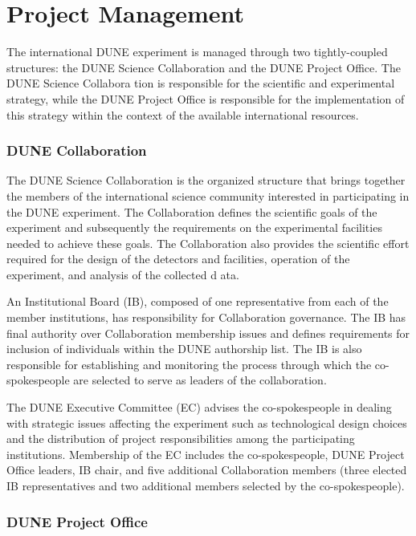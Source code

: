 \chapter{Project Management}
\label{ch:detectors-pm}

The international DUNE experiment is managed through two
tightly-coupled structures: the DUNE Science Collaboration and the
DUNE Project Office.  The DUNE Science Collabora tion is responsible
for the scientific and experimental strategy, while the DUNE Project
Office is responsible for the implementation of this strategy within
the context of the available international resources.

\subsection{DUNE Collaboration}

The DUNE Science Collaboration is the organized structure that brings
together the members of the international science community interested
in participating in the DUNE experiment.  The Collaboration defines
the scientific goals of the experiment and subsequently the
requirements on the experimental facilities needed to achieve these
goals.  The Collaboration also provides the scientific effort required
for the design of the detectors and facilities, operation of the
experiment, and analysis of the collected d ata.

An Institutional Board (IB), composed of one representative from each
of the member institutions, has responsibility for Collaboration
governance.  The IB has final authority over Collaboration membership
issues and defines requirements for inclusion of individuals within
the DUNE authorship list. The IB is also responsible for establishing
and monitoring the process through which the co-spokespeople are
selected to serve as leaders of the collaboration.

The DUNE Executive Committee (EC) advises the co-spokespeople in
dealing with strategic issues affecting the experiment such as
technological design choices and the distribution of project
responsibilities among the participating institutions.  Membership of
the EC includes the co-spokespeople, DUNE Project Office leaders, IB
chair, and five additional Collaboration members (three elected IB
representatives and two additional members selected by the
co-spokespeople).

\subsection{DUNE Project Office}


